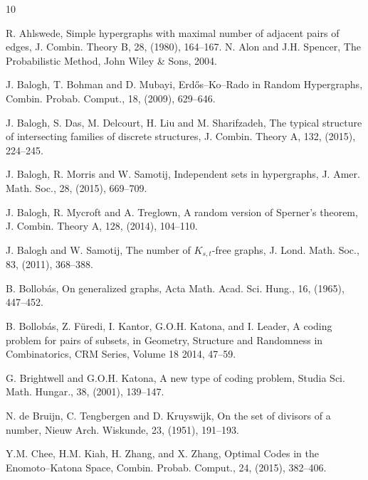 \documentclass[11pt]{article}
\numberwithin{equation}{section}
\begin{document}
\begin{thebibliography}{10}

 R. Ahlswede,
Simple hypergraphs with maximal number of adjacent pairs of edges,
J. Combin. Theory B,
28,
(1980), 164--167.
 N. Alon and J.H. Spencer, The Probabilistic Method, John Wiley \& Sons, 2004.

 J. Balogh, T. Bohman and D. Mubayi,  Erd\H{o}s--Ko--Rado in Random Hypergraphs, Combin. Probab.  Comput.,  18, (2009),  629--646. 

 J. Balogh,   S. Das, M. Delcourt, H. Liu and M. Sharifzadeh,    The typical structure of intersecting families of discrete structures, J. Combin. Theory  A,  132, (2015), 224--245.

 J. Balogh, R. Morris and W. Samotij,   Independent sets in hypergraphs, J. Amer. Math. Soc.,   28, (2015),  669--709.

 J. Balogh, R. Mycroft and A. Treglown, A random version of Sperner's theorem,  J. Combin. Theory  A,  128, (2014), 104--110. 



 J. Balogh and W. Samotij, The number of $K_{s,t}$-free graphs, J. Lond. Math. Soc., 83, (2011), 368--388.

 B. Bollob\'{a}s, On generalized graphs, Acta Math. Acad. Sci. Hung., 16, (1965), 447--452.

 B. Bollob\'as, Z. F\"uredi, I. Kantor, G.O.H. Katona, and I. Leader, A coding problem for pairs of subsets, in Geometry, Structure and Randomness in Combinatorics, 
CRM Series, Volume 18 2014, 47--59.


 G. Brightwell and G.O.H. Katona, A new type of coding problem, Studia Sci. Math. Hungar.,  38, (2001),  139--147.

 N. de Bruijn, C. Tengbergen and D. Kruyswijk, On the set of divisors of a number, Nieuw Arch. Wiskunde, 23, (1951), 191--193.

 Y.M. Chee, H.M. Kiah, H. Zhang, and X. Zhang, Optimal Codes in the Enomoto--Katona Space, Combin. Probab.  Comput., 24, (2015), 382--406.


\end{thebibliography}
\end{document}
